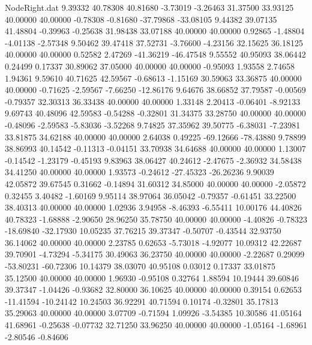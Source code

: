 \begin{filecontents}{NodeRight.dat}
   9.39332   40.78308   40.81680    -3.73019   -3.26463   31.37500   33.93125   40.00000   40.00000   -0.78308   -0.81680  -37.79868  -33.08105
   9.44382   39.07135   41.48804    -0.39963   -0.25638   31.98438   33.07188   40.00000   40.00000    0.92865   -1.48804   -4.01138   -2.57348
   9.50462   39.47418   37.52731    -3.76600   -4.23156   32.15625   36.18125   40.00000   40.00000    0.52582    2.47269  -41.36219  -46.47548
   9.55552   40.95093   38.06442     0.24499    0.17337   30.89062   37.05000   40.00000   40.00000   -0.95093    1.93558    2.74658    1.94361
   9.59610   40.71625   42.59567    -0.68613   -1.15169   30.59063   33.36875   40.00000   40.00000   -0.71625   -2.59567   -7.66250  -12.86176
   9.64676   38.66852   37.79587    -0.00569   -0.79357   32.30313   36.33438   40.00000   40.00000    1.33148    2.20413   -0.06401   -8.92133
   9.69743   40.48096   42.59583    -0.54288   -0.32801   31.34375   33.28750   40.00000   40.00000   -0.48096   -2.59583   -5.83036   -3.52268
   9.74825   37.35962   39.50775    -6.38031   -7.23981   33.81875   34.62188   40.00000   40.00000    2.64038    0.49225  -69.12666  -78.43880
   9.78899   38.86993   40.14542    -0.11313   -0.04151   33.70938   34.64688   40.00000   40.00000    1.13007   -0.14542   -1.23179   -0.45193
   9.83963   38.06427   40.24612    -2.47675   -2.36932   34.58438   34.41250   40.00000   40.00000    1.93573   -0.24612  -27.45323  -26.26236
   9.90039   42.05872   39.67545     0.31662   -0.14894   31.60312   34.85000   40.00000   40.00000   -2.05872    0.32455    3.40482   -1.60169
   9.95114   38.97064   36.05042    -0.79357   -0.61451   33.22500   38.40313   40.00000   40.00000    1.02936    3.94958   -8.46393   -6.55411
  10.00176   44.40826   40.78323    -1.68888   -2.90650   28.96250   35.78750   40.00000   40.00000   -4.40826   -0.78323  -18.69840  -32.17930
  10.05235   37.76215   39.37347    -0.50707   -0.43544   32.93750   36.14062   40.00000   40.00000    2.23785    0.62653   -5.73018   -4.92077
  10.09312   42.22687   39.70901    -4.73294   -5.34175   30.49063   36.23750   40.00000   40.00000   -2.22687    0.29099  -53.80231  -60.72306
  10.14379   38.03070   40.95108     0.03012    0.17337   33.01875   35.12500   40.00000   40.00000    1.96930   -0.95108    0.32764    1.88594
  10.19444   39.60846   39.37347    -1.04426   -0.93682   32.80000   36.10625   40.00000   40.00000    0.39154    0.62653  -11.41594  -10.24142
  10.24503   36.92291   40.71594     0.10174   -0.32801   35.17813   35.29063   40.00000   40.00000    3.07709   -0.71594    1.09926   -3.54385
  10.30586   41.05164   41.68961    -0.25638   -0.07732   32.71250   33.96250   40.00000   40.00000   -1.05164   -1.68961   -2.80546   -0.84606

\end{filecontents}
